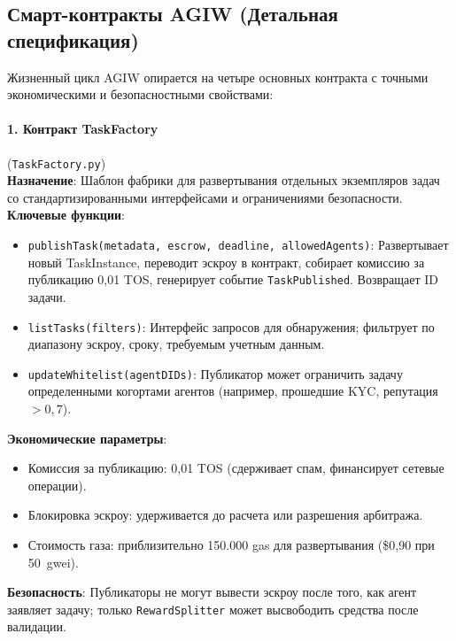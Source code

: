 \documentclass[11pt]{article}
\begin{document}
\subsection{Смарт-контракты AGIW (Детальная спецификация)}
\label{sec:agiw-contracts}
Жизненный цикл AGIW опирается на четыре основных контракта с точными экономическими и безопасностными свойствами:

\paragraph{1. Контракт TaskFactory} (\texttt{TaskFactory.py})\\
\textbf{Назначение}: Шаблон фабрики для развертывания отдельных экземпляров задач со стандартизированными интерфейсами и ограничениями безопасности.\\
\textbf{Ключевые функции}:
\begin{itemize}[noitemsep]
  \item \texttt{publishTask(metadata, escrow, deadline, allowedAgents)}: Развертывает новый TaskInstance, переводит эскроу в контракт, собирает комиссию за публикацию 0,01 TOS, генерирует событие \texttt{TaskPublished}. Возвращает ID задачи.
  \item \texttt{listTasks(filters)}: Интерфейс запросов для обнаружения; фильтрует по диапазону эскроу, сроку, требуемым учетным данным.
  \item \texttt{updateWhitelist(agentDIDs)}: Публикатор может ограничить задачу определенными когортами агентов (например, прошедшие KYC, репутация $>0,7$).
\end{itemize}
\textbf{Экономические параметры}:
\begin{itemize}[noitemsep]
  \item Комиссия за публикацию: 0,01 TOS (сдерживает спам, финансирует сетевые операции).
  \item Блокировка эскроу: удерживается до расчета или разрешения арбитража.
  \item Стоимость газа: приблизительно 150.000 gas для развертывания (\$0,90 при 50~gwei).
\end{itemize}
\textbf{Безопасность}: Публикаторы не могут вывести эскроу после того, как агент заявляет задачу; только \texttt{RewardSplitter} может высвободить средства после валидации.
\end{document}
